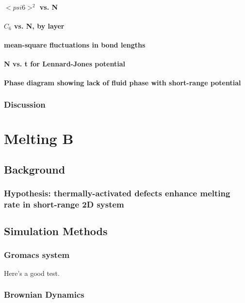 \documentclass{umthesis}
\begin{document}
\subsubsection{$< psi6 >^2$ vs. N}
\label{sec-1.3.6.2}
\subsubsection{$C_6$ vs. N, by layer}
\label{sec-1.3.6.3}
\subsubsection{mean-square fluctuations in bond lengths}
\label{sec-1.3.6.4}
\subsubsection{N vs. t for Lennard-Jones potential}
\label{sec-1.3.6.5}
\subsubsection{Phase diagram showing lack of fluid phase with short-range potential}
\label{sec-1.3.6.6}
\subsection{Discussion}
\label{sec-1.3.7}
\chapter{Melting B}
\label{sec-2}
\section{Background}
\label{sec-2.1}
\subsection{Hypothesis: thermally-activated defects enhance melting rate in short-range 2D system}
\label{sec-2.1.1}
\section{Simulation Methods}
\label{sec-2.2}
\subsection{Gromacs system}
\label{sec-2.2.1}

Here's a good test. \cite{Deng2009}
\subsection{Brownian Dynamics}
\label{sec-2.2.2}
\end{document}
